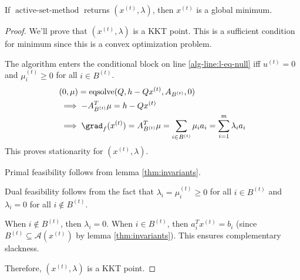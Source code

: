 \begin{theorem}[Correctness]
If $\operatorname{active-set-method}$ returns $(x^{(t)}, \lambda)$,
then $x^{(t)}$ is a global minimum.
\end{theorem}
\begin{proof}
We'll prove that $(x^{(t)}, \lambda)$ is a KKT point.
This is a sufficient condition for minimum since this is a convex optimization problem.

The algorithm enters the conditional block on line \ref{alg-line:l-eq-null}
iff $u^{(t)} = 0$ and $\mu^{(t)}_i \ge 0$ for all $i \in B^{(t)}$.
\begin{align*}
& (0, \mu) = \operatorname{eqsolve}(Q, h - Qx^{(t)}, A_{B^{(t)}}, 0)
\\ &\implies -A_{B^{(t)}}^T\mu = h - Qx^{(t)}
\\ &\implies \grad_f(x^{(t)}) = A_{B^{(t)}}^T\mu = \sum_{i \in B^{(t)}} \mu_ia_i = \sum_{i=1}^m \lambda_ia_i
\end{align*}
This proves stationarity for $(x^{(t)}, \lambda)$.

Primal feasibility follows from lemma \ref{thm:invariants}.

Dual feasibility follows from the fact that $\lambda_i = \mu^{(t)}_i \ge 0$ for all $i \in B^{(t)}$
and $\lambda_i = 0$ for all $i \not\in B^{(t)}$.

When $i \not\in B^{(t)}$, then $\lambda_i = 0$.
When $i \in B^{(t)}$, then $a_i^Tx^{(t)} = b_i$
(since $B^{(t)} \subseteq \mathcal{A}(x^{(t)})$ by lemma \ref{thm:invariants}).
This ensures complementary slackness.

Therefore, $(x^{(t)}, \lambda)$ is a KKT point.
\end{proof}

